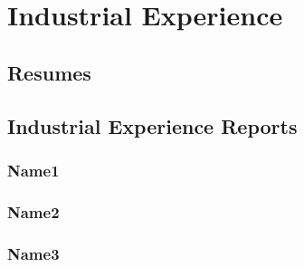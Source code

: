 
\chapter{Industrial Experience}

\section{Resumes}


%     
%     
%     

\section{Industrial Experience Reports}

\subsection{Name1}


\subsection{Name2}


\subsection{Name3}


